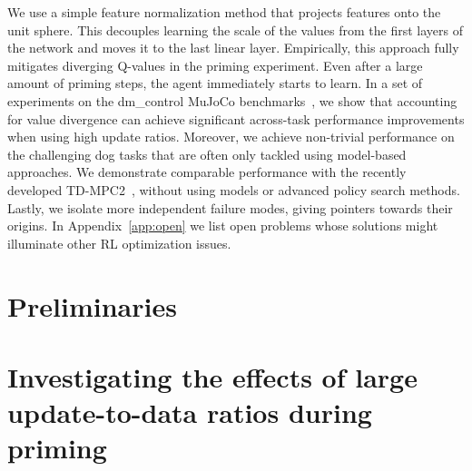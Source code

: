 We use a simple feature normalization method \parencite{zhang2019root, wang2020striving, bjorck2022is} that projects features onto the unit sphere.
This decouples learning the scale of the values from the first layers of the network and moves it to the last linear layer.
Empirically, this approach fully mitigates diverging Q-values in the priming experiment. Even after a large amount of priming steps, the agent immediately starts to learn. %
In a set of experiments on the \textsf{dm\_control} MuJoCo benchmarks~\parencite{tunyasuvunakool2020dmcontrol}, we show that accounting for value divergence can achieve significant across-task performance improvements when using high update ratios. 
Moreover, we achieve non-trivial performance on the challenging dog tasks that are often only tackled using model-based approaches. We demonstrate comparable performance with the recently developed TD-MPC2~\parencite{hansen2024tdmpc}, without using models or advanced policy search methods.
Lastly, we isolate more independent failure modes, giving pointers towards their origins. In Appendix~\ref{app:open} we list open problems whose solutions might illuminate other RL optimization issues.


\section{Preliminaries} \label{sec:preliminaries}

\section{Investigating the effects of large update-to-data ratios during priming} \label{sec:investigating}

